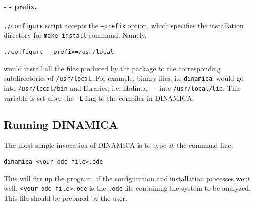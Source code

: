 \documentclass[11pt,a4paper]{article}
\begin{document}
\paragraph{- - prefix.}
\label{sec:-prefix}

\texttt{./configure} script accepts the \texttt{--prefix} option, which specifies the
installation directory for \texttt{make install} command. Namely,

\begin{verbatim}
./configure --prefix=/usr/local
\end{verbatim}
would install all the files produced by the package to the corresponding
subdirectories of \texttt{/usr/local}. For example, binary files, i.e
\texttt{dinamica}, would go into \texttt{/usr/local/bin} and libraries,
i.e. libdin.a, --- into \texttt{/usr/local/lib}. This variable is set after the
\texttt{-L} flag to the compiler in DINAMICA.

\subsection{Running DINAMICA}
\label{sec:running-dinamica}

The most simple invocation of DINAMICA is to type at the command line:
\begin{verbatim}
dinamica <your_ode_file>.ode
\end{verbatim}
This will fire up the program, if the configuration and installation processes went
well. \texttt{<your\_ode\_file>.ode} is the \texttt{.ode} file containing the system
to be analyzed. This file should be prepared by the user.
\end{document}
